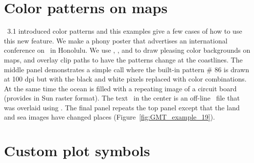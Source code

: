 

\section{Color patterns on maps}

\GMT\ 3.1 introduced color patterns and this examples give
a few cases of how to use this new feature.  We make a phony
poster that advertises an international conference on \GMT\
in Honolulu.  We use , , and
 to draw pleasing color backgrounds on maps,
and overlay  clip paths to have the patterns
change at the coastlines.  The middle panel demonstrates a
simple \GMTprog{pscoast} call where the built-in pattern \# 86
is drawn at 100 dpi but with the black and white pixels
replaced with color combinations. At the same time the ocean is filled with a repeating
image of a circuit board (provides in Sun raster format).
The text \GMT\ in the center is an off-line \PS\ file that was overlaid using .
The final panel repeats the top panel except that the land and sea images have changed places
(Figure~\ref{fig:GMT_example_19}).



\section{Custom plot symbols}

